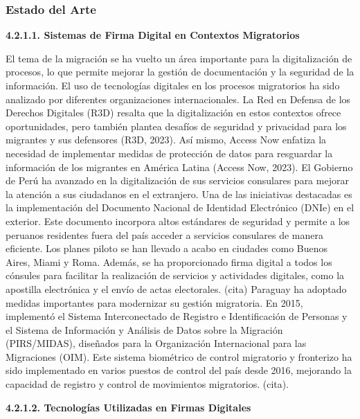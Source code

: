 \documentclass{amsart}
\begin{document}
    \subsubsection{Estado del Arte}
    
    
   \textbf{ 4.2.1.1. Sistemas de Firma Digital en Contextos Migratorios }
    
    El tema de la migración se ha vuelto un área importante para la digitalización de procesos, lo que permite mejorar la gestión de documentación y la seguridad de la información. El uso de tecnologías digitales en los procesos migratorios ha sido analizado por diferentes organizaciones internacionales.
    La Red en Defensa de los Derechos Digitales (R3D) resalta que la digitalización en estos contextos ofrece oportunidades, pero también plantea desafíos de seguridad y privacidad para los migrantes y sus defensores (R3D, 2023). Así mismo, Access Now enfatiza la necesidad de implementar medidas de protección de datos para resguardar la información de los migrantes en América Latina (Access Now, 2023).
    El Gobierno de Perú ha avanzado en la digitalización de sus servicios consulares para mejorar la atención a sus ciudadanos en el extranjero. Una de las iniciativas destacadas es la implementación del Documento Nacional de Identidad Electrónico (DNIe) en el exterior. Este documento incorpora altos estándares de seguridad y permite a los peruanos residentes fuera del país acceder a servicios consulares de manera eficiente. Los planes piloto se han llevado a acabo en ciudades como Buenos Aires, Miami y Roma. Además, se ha proporcionado firma digital a todos los cónsules para facilitar la realización de servicios y actividades digitales, como la apostilla electrónica y el envío de actas electorales. (cita)
    Paraguay ha adoptado medidas importantes para modernizar su gestión migratoria. En 2015, implementó el Sistema Interconectado de Registro e Identificación de Personas y el Sistema de Información y Análisis de Datos sobre la Migración (PIRS/MIDAS), diseñados para la Organización Internacional para las Migraciones (OIM). Este sistema biométrico de control migratorio y fronterizo ha sido implementado en varios puestos de control del país desde 2016, mejorando la capacidad de registro y control de movimientos migratorios. (cita).
    
    
    \textbf{ 4.2.1.2. Tecnologías Utilizadas en Firmas Digitales }
    
\end{document}
